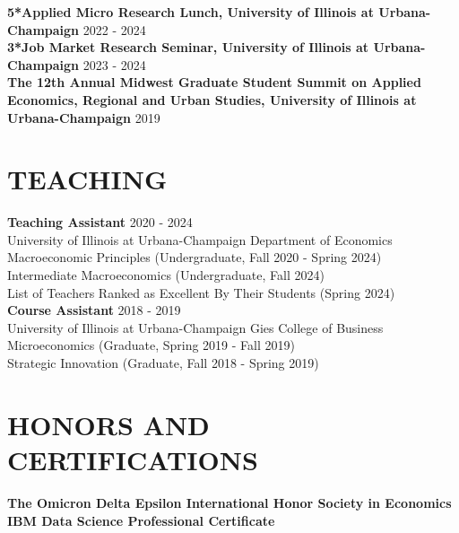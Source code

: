 \documentclass[a4paper,9pt]{extarticle}
\begin{document}
\noindent
\newline
\textbf{5*Applied Micro Research Lunch, University of Illinois at Urbana-Champaign} \hfill  2022 - 2024 \\
\textbf{3*Job Market Research Seminar, University of Illinois at Urbana-Champaign} \hfill  2023 - 2024 \\
\textbf{The 12th Annual Midwest Graduate Student Summit on Applied Economics, Regional and Urban Studies, University of Illinois at Urbana-Champaign} \hfill 2019 \\


\section*{TEACHING}

\noindent
\textbf{Teaching Assistant} \hfill 2020 - 2024 \\
University of Illinois at Urbana-Champaign \hfill Department of Economics \\
\newline
Macroeconomic Principles (Undergraduate, Fall 2020 - Spring 2024) \\
Intermediate Macroeconomics (Undergraduate, Fall 2024) \\
List of Teachers Ranked as Excellent By Their Students (Spring 2024) \\

\noindent
\textbf{Course Assistant} \hfill 2018 - 2019 \\
University of Illinois at Urbana-Champaign \hfill Gies College of Business \\
\newline
Microeconomics (Graduate, Spring 2019 - Fall 2019) \\
Strategic Innovation (Graduate, Fall 2018 - Spring 2019) \\


\section*{HONORS AND CERTIFICATIONS}

\noindent
\newline
\textbf{The Omicron Delta Epsilon International Honor Society in Economics} \\

\noindent
\textbf{IBM Data Science Professional Certificate} \\
\end{document}
